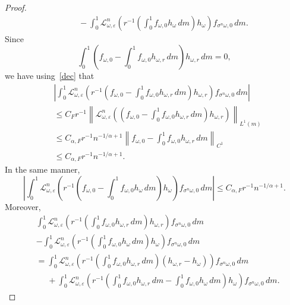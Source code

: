 \documentclass[12pt,reqno,a4paper]{article}
\begin{document}
\begin{proof}
\[\begin{split}
		&\phantom{=}-\int_0^1 \mathcal L_{\omega, \varepsilon}^n \left (r^{-1} \left (\int_0^1 f_{\omega, 0}h_\omega\, dm\right )h_\omega \right )f_{\sigma^n \omega, 0}\, dm.
	\end{split}
	\]
	Since 
	\[
	\int_0^1 \left (f_{\omega, 0}-\int_0^1f_{\omega, 0}h_{\omega, r}\, dm\right )h_{\omega, r}\, dm=0,
	\]
	we have using~\eqref{dec} that 
	\begin{equation}\label{gh2}
		\begin{split}
			&\left | \int_0^1 \mathcal L_{\omega, \varepsilon}^n \left (r^{-1}\left (f_{\omega, 0}-\int_0^1f_{\omega, 0}h_{\omega, r}\, dm\right )h_{\omega, r}\right )f_{\sigma^n \omega, 0}\, dm\right | \\
			&\le C_F r^{-1} \left \|\mathcal L_{\omega, \varepsilon}^n \left (\left (f_{\omega, 0}-\int_0^1f_{\omega, 0}h_{\omega, r}\, dm\right )h_{\omega, r} \right )\right \|_{L^1(m)} \\
			&\le C_{\alpha, F} r^{-1}n^{-1/\alpha+1} \left \|f_{\omega, 0}-\int_0^1f_{\omega, 0}h_{\omega, r}\, dm \right \|_{C^1} \\
			&\le C_{\alpha, F} r^{-1}n^{-1/\alpha+1}.
		\end{split}
	\end{equation}
	In the same manner, 
	\begin{equation}\label{gh3}
		\left |\int_0^1 \mathcal L_{\omega, \varepsilon}^n \left(r^{-1} \left (f_{\omega, 0}-\int_0^1 f_{\omega, 0}h_\omega\, dm\right )h_\omega \right )f_{\sigma^n \omega, 0}\, dm\right |\le C_{\alpha, F} r^{-1}n^{-1/\alpha+1}.
	\end{equation}
	Moreover, 
	\[
	\begin{split}
		&\int_0^1 \mathcal L_{\omega, \varepsilon}^n \left (r^{-1}\left (\int_0^1 f_{\omega, 0}h_{\omega, r}\, dm\right )h_{\omega, r}\right )f_{\sigma^n \omega, 0}\, dm\\
		&-\int_0^1 \mathcal L_{\omega, \varepsilon}^n \left (r^{-1} \left (\int_0^1 f_{\omega, 0}h_\omega\, dm\right )h_\omega \right )f_{\sigma^n \omega, 0}\, dm \\
		&=\int_0^1 \mathcal L_{\omega, \varepsilon}^n \left (r^{-1} \left(\int_0^1f_{\omega, 0}h_{\omega, r}\, dm\right ) (h_{\omega, r}-h_{\omega}) \right )f_{\sigma^n \omega, 0}\, dm \\
		&\phantom{=}+\int_0^1 \mathcal L_{\omega, \varepsilon}^n \left (r^{-1}\left (\int_0^1 f_{\omega, 0}h_{\omega, r}\, dm-\int_0^1f_{\omega, 0}h_\omega \, dm\right )h_\omega \right )f_{\sigma^n \omega, 0}\, dm.
	\end{split}
\]
\end{proof}
\end{document}
